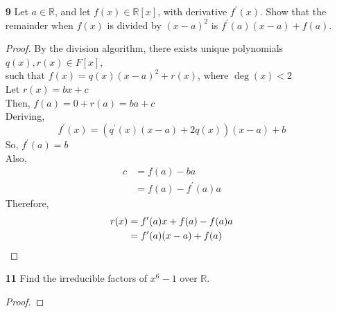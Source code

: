 \documentclass[paper=usletter, fontsize=12pt]{article}
\begin{document}
\begin{enumerate}
\begin{enumerate}
\begin{enumerate}
\begin{proof}
                    Therefore,
                    $\gcd(x^5+4x^4+6x^3+6x^2+5x+2,x^4+3x^2+3x+6)=2 \in
                    \mathbb{Z}_7$ \qedhere

                \end{proof}

            \end{enumerate}

            \item[\textbf{9}] Let $a \in \mathbb{R}$, and let $f(x)\in
            \mathbb{R}[x]$, with derivative $f^\prime(x)$. Show that the
            remainder when $f(x)$ is divided by $(x-a)^2$ is
            $f^\prime(a)(x-a)+f(a)$.
            \begin{proof}

                By the division algorithm, there exists unique polynomials
                $q(x), r(x) \in F[x]$,\\ such that $f(x) = q(x)(x-a)^2+r(x)$,
                where $\deg(x) < 2$\\

                Let $r(x) = bx + c$\\
                Then, $f(a) = 0 + r(a) = ba + c$\\
                Deriving,
                \begin{equation*}
                    f^\prime(x)=(q^\prime(x)(x-a)+2q(x))(x-a)+b
                \end{equation*}
                So, $f^\prime(a)=b$\\
                Also,
                \begin{align*}
                    c &= f(a) - ba\\
                    & = f(a) - f^\prime(a)a
                \end{align*}
                Therefore,
                \begin{align*}
                    r(x) &= f^\prime(a)x + f(a) - f(a)a \\
                    & = f^\prime(a)(x - a) + f(a) \qedhere
                \end{align*}

            \end{proof}

            \item[\textbf{11}] Find the irreducible factors of $x^6-1$ over
            $\mathbb{R}$.
            \begin{proof}


\end{proof}
\end{enumerate}
\end{enumerate}
\end{document}
